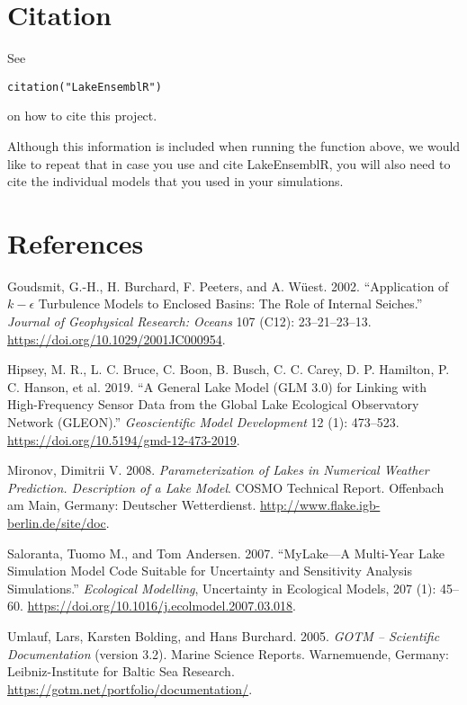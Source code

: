 \documentclass[
]{article}
\begin{document}
\hypertarget{citation}{%
\section{Citation}\label{citation}}

See

\begin{verbatim}
citation("LakeEnsemblR")
\end{verbatim}

on how to cite this project.

Although this information is included when running the function above,
we would like to repeat that in case you use and cite LakeEnsemblR, you
will also need to cite the individual models that you used in your
simulations.

\hypertarget{references}{%
\section*{References}\label{references}}

\hypertarget{refs}{}
\leavevmode\hypertarget{ref-goudsmit_application_2002}{}%
Goudsmit, G.-H., H. Burchard, F. Peeters, and A. Wüest. 2002.
``Application of \(k-\epsilon\) Turbulence Models to Enclosed Basins:
The Role of Internal Seiches.'' \emph{Journal of Geophysical Research:
Oceans} 107 (C12): 23--21--23--13.
\url{https://doi.org/10.1029/2001JC000954}.

\leavevmode\hypertarget{ref-hipsey_general_2019}{}%
Hipsey, M. R., L. C. Bruce, C. Boon, B. Busch, C. C. Carey, D. P.
Hamilton, P. C. Hanson, et al. 2019. ``A General Lake Model (GLM 3.0)
for Linking with High-Frequency Sensor Data from the Global Lake
Ecological Observatory Network (GLEON).'' \emph{Geoscientific Model
Development} 12 (1): 473--523.
\url{https://doi.org/10.5194/gmd-12-473-2019}.

\leavevmode\hypertarget{ref-mironov_flake_2008}{}%
Mironov, Dimitrii V. 2008. \emph{Parameterization of Lakes in Numerical
Weather Prediction. Description of a Lake Model}. COSMO Technical
Report. Offenbach am Main, Germany: Deutscher Wetterdienst.
\url{http://www.flake.igb-berlin.de/site/doc}.

\leavevmode\hypertarget{ref-saloranta_mylakemulti_year_2007}{}%
Saloranta, Tuomo M., and Tom Andersen. 2007. ``MyLake---A Multi-Year
Lake Simulation Model Code Suitable for Uncertainty and Sensitivity
Analysis Simulations.'' \emph{Ecological Modelling}, Uncertainty in
Ecological Models, 207 (1): 45--60.
\url{https://doi.org/10.1016/j.ecolmodel.2007.03.018}.

\leavevmode\hypertarget{ref-umlauf_gotm_2005}{}%
Umlauf, Lars, Karsten Bolding, and Hans Burchard. 2005. \emph{GOTM --
Scientific Documentation} (version 3.2). Marine Science Reports.
Warnemuende, Germany: Leibniz-Institute for Baltic Sea Research.
\url{https://gotm.net/portfolio/documentation/}.
\end{document}
